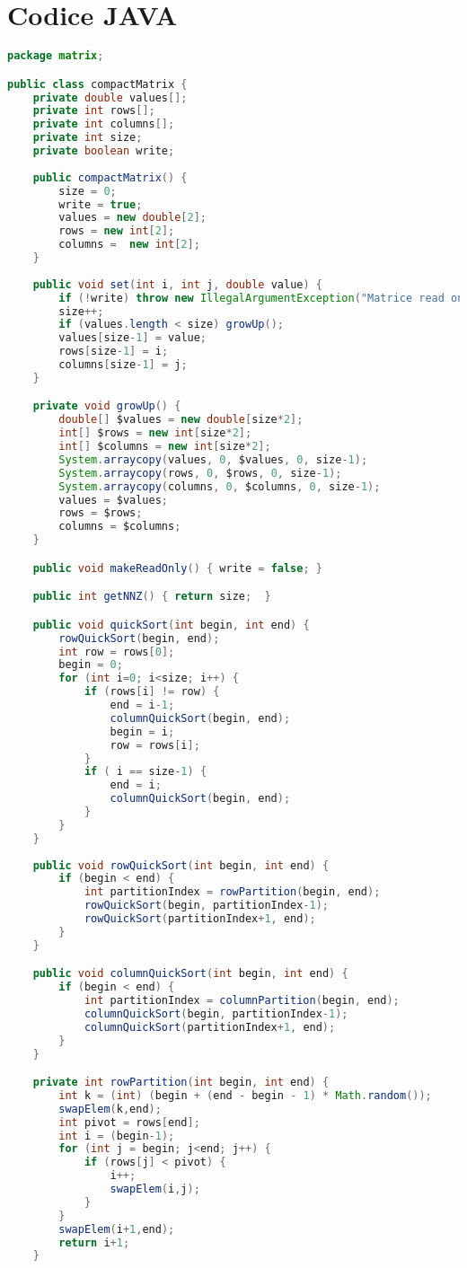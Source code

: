 \documentclass[12pt]{article}
\begin{document}
\section{Codice JAVA}
\begin{lstlisting}[language=Java]
package matrix;

public class compactMatrix {
	private double values[];
	private int rows[];
	private int columns[];
	private int size;
	private boolean write;
	
	public compactMatrix() {
		size = 0;
		write = true;
		values = new double[2];
		rows = new int[2];
		columns =  new int[2];
	}
	
	public void set(int i, int j, double value) {
		if (!write) throw new IllegalArgumentException("Matrice read only!");
		size++;
		if (values.length < size) growUp();
		values[size-1] = value;
		rows[size-1] = i;
		columns[size-1] = j;
	}

	private void growUp() {
		double[] $values = new double[size*2];
		int[] $rows = new int[size*2];
		int[] $columns = new int[size*2];
		System.arraycopy(values, 0, $values, 0, size-1);
		System.arraycopy(rows, 0, $rows, 0, size-1);
		System.arraycopy(columns, 0, $columns, 0, size-1);
		values = $values;
		rows = $rows;
		columns = $columns;
	}

	public void makeReadOnly() { write = false;	}

	public int getNNZ() { return size;	}

	public void quickSort(int begin, int end) {
		rowQuickSort(begin, end);
		int row = rows[0];
		begin = 0;
		for (int i=0; i<size; i++) {
			if (rows[i] != row) {
				end = i-1;
				columnQuickSort(begin, end);
				begin = i;
				row = rows[i];
			}
			if ( i == size-1) {
				end = i;
				columnQuickSort(begin, end);
			}
		}
	}
	
	public void rowQuickSort(int begin, int end) {
		if (begin < end) {
			int partitionIndex = rowPartition(begin, end);
			rowQuickSort(begin, partitionIndex-1);
			rowQuickSort(partitionIndex+1, end);
		}
	}

	public void columnQuickSort(int begin, int end) {
		if (begin < end) {
			int partitionIndex = columnPartition(begin, end);
			columnQuickSort(begin, partitionIndex-1);
			columnQuickSort(partitionIndex+1, end);
		}
	}

	private int rowPartition(int begin, int end) {
		int k = (int) (begin + (end - begin - 1) * Math.random());
		swapElem(k,end);
		int pivot = rows[end];
		int i = (begin-1);
		for (int j = begin; j<end; j++) {
			if (rows[j] < pivot) {
				i++;
				swapElem(i,j);
			}
		}
		swapElem(i+1,end);
		return i+1;
	}
	

\end{lstlisting}
\end{document}
